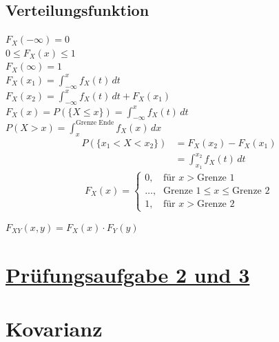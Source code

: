 \documentclass[12pt]{article}
\begin{document}
   \hfill
   \begin{minipage}[t]{0.45\textwidth}

   \subsection*{Verteilungsfunktion}

      \(F_X(-\infty) = 0\) \\[10pt]
      \(0 \leq F_X(x) \leq 1\) \\[10pt]
      \(F_X(\infty) = 1\) \\[10pt]
      \(F_X(x_1) = \int_{-\infty}^{x} f_X(t) \, dt\) \\[10pt]
      \(F_X(x_2) = \int_{-\infty}^{x} f_X(t) \, dt + F_X(x_1)\) \\[10pt]
      \(F_X(x) = P(\{X \leq x\}) = \int_{-\infty}^{x} f_X(t) \, dt\) \\[10pt]
      \(P(X > x) = \int_{x}^{\text{Grenze Ende}} f_X(x) \, dx\)
      \begin{align*}
         P(\{x_1 < X < x_2\})    &= F_X(x_2) - F_X(x_1) \\[10pt]
         &= \int_{x_1}^{x_2} f_X(t) \, dt
      \end{align*}
      \[
      F_X(x) = 
      \begin{cases}
         0, & \text{für } x > \text{Grenze 1} \\[5pt]
         \text{\ldots}, & \text{Grenze 1} \le x \le \text{Grenze 2} \\[5pt]
         1, & \text{für } x > \text{Grenze 2}
      \end{cases}
      \] 

      \(F_{XY}(x, y) = F_X(x) \cdot F_Y(y)\)
   \end{minipage}
\newpage


\section*{\underline{Prüfungsaufgabe 2 und 3}}

\pagecolor{Aufgabe2}

\tableofcontents
\newpage

\noindent

\section{Kovarianz}
\end{document}
